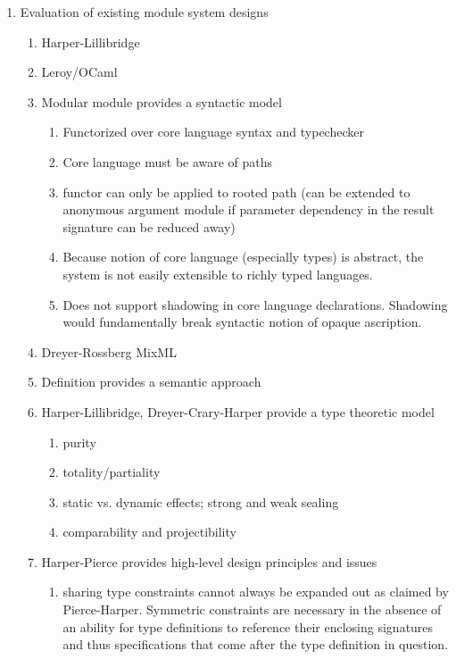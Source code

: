 \documentclass[12pt]{article}
\begin{document}
\begin{enumerate}
\begin{enumerate}
\begin{enumerate}
		\end{enumerate}
		\item Evaluation of existing module system designs
		\begin{enumerate}
			\item Harper-Lillibridge
			\item Leroy/OCaml
			\item Modular module\cite{leroy00} provides a syntactic model 
			\begin{enumerate}
				\item Functorized over core language syntax and typechecker
				\item Core language must be aware of paths
				\item functor can only be applied to rooted path (can be extended to anonymous argument module if parameter dependency in the result signature can be reduced away)
				\item Because notion of core language (especially types) is abstract, the system is not easily extensible to richly typed languages. 
				\item Does not support shadowing in core language declarations. Shadowing would fundamentally break syntactic notion of opaque ascription. 
			\end{enumerate}
			\item Dreyer-Rossberg MixML
			\item Definition \cite{mthm97} provides a semantic approach
			\item Harper-Lillibridge\cite{lillibridge94}, Dreyer-Crary-Harper\cite{dhc03} provide a type theoretic model
			\begin{enumerate}
				\item purity
				\item totality/partiality
				\item static vs. dynamic effects; strong and weak sealing
				\item comparability and projectibility
			\end{enumerate}
			\item Harper-Pierce \cite{ATTAPL} provides high-level design principles and issues
			\begin{enumerate}
				\item sharing type constraints cannot always be expanded out as claimed by Pierce-Harper. Symmetric constraints are necessary in the absence of an ability for type definitions to reference their enclosing signatures and thus specifications that come after the type definition in question. 

\end{enumerate}
\end{enumerate}
\end{enumerate}
\end{enumerate}
\end{document}
